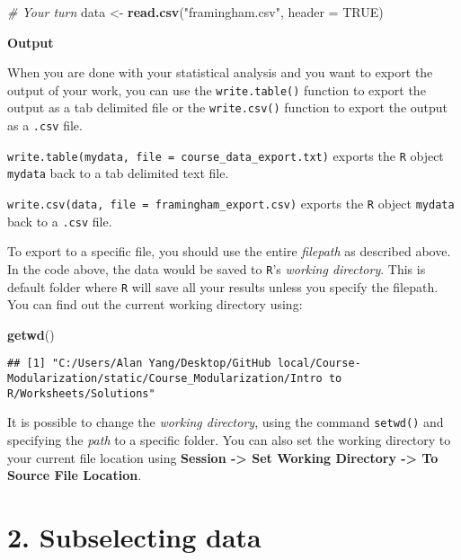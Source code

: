 \documentclass[
]{article}
\newenvironment{Shaded}{\begin{snugshade}}{\end{snugshade}}
\newcommand{\CommentTok}[1]{\textcolor[rgb]{0.56,0.35,0.01}{\textit{#1}}}
\newcommand{\DataTypeTok}[1]{\textcolor[rgb]{0.13,0.29,0.53}{#1}}
\newcommand{\KeywordTok}[1]{\textcolor[rgb]{0.13,0.29,0.53}{\textbf{#1}}}
\newcommand{\NormalTok}[1]{#1}
\newcommand{\OtherTok}[1]{\textcolor[rgb]{0.56,0.35,0.01}{#1}}
\newcommand{\StringTok}[1]{\textcolor[rgb]{0.31,0.60,0.02}{#1}}
\begin{document}
\begin{Shaded}
\begin{Highlighting}[]
\CommentTok{# Your turn}
\NormalTok{data <-}\StringTok{ }\KeywordTok{read.csv}\NormalTok{(}\StringTok{"framingham.csv"}\NormalTok{, }\DataTypeTok{header =} \OtherTok{TRUE}\NormalTok{)}
\end{Highlighting}
\end{Shaded}

\textbf{Output}

When you are done with your statistical analysis and you want to export
the output of your work, you can use the \texttt{write.table()} function
to export the output as a tab delimited file or the \texttt{write.csv()}
function to export the output as a \texttt{.csv} file.

\texttt{write.table(mydata,\ file\ =\ \textquotesingle{}course\_data\_export.txt\textquotesingle{})}
exports the \texttt{R} object \texttt{mydata} back to a tab delimited
text file.

\texttt{write.csv(data,\ file\ =\ \textquotesingle{}framingham\_export.csv\textquotesingle{})}
exports the \texttt{R} object \texttt{mydata} back to a \texttt{.csv}
file.

To export to a specific file, you should use the entire \emph{filepath}
as described above. In the code above, the data would be saved to
\texttt{R}'s \emph{working directory}. This is default folder where
\texttt{R} will save all your results unless you specify the filepath.
You can find out the current working directory using:

\begin{Shaded}
\begin{Highlighting}[]
\KeywordTok{getwd}\NormalTok{()}
\end{Highlighting}
\end{Shaded}

\begin{verbatim}
## [1] "C:/Users/Alan Yang/Desktop/GitHub local/Course-Modularization/static/Course_Modularization/Intro to R/Worksheets/Solutions"
\end{verbatim}

It is possible to change the \emph{working directory}, using the command
\texttt{setwd()} and specifying the \emph{path} to a specific folder.
You can also set the working directory to your current file location
using \textbf{Session -\textgreater{} Set Working Directory
-\textgreater{} To Source File Location}.

\hypertarget{subselecting-data}{%
\section{2. Subselecting data}\label{subselecting-data}}
\end{document}
